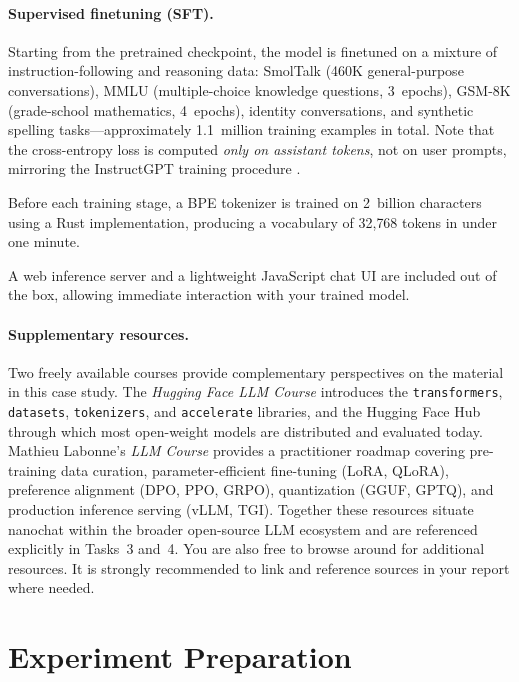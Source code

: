 \paragraph{Supervised finetuning (SFT).}  Starting from the pretrained checkpoint, the model is finetuned on a mixture of instruction-following and reasoning data: SmolTalk \citep{benallal2024smoltalk} (460K general-purpose conversations), MMLU (multiple-choice knowledge questions, 3~epochs), GSM-8K (grade-school mathematics, 4~epochs), identity conversations, and synthetic spelling tasks---approximately 1.1~million training examples in total. Note that  the cross-entropy loss is computed \emph{only on assistant tokens}, not on user prompts, mirroring the InstructGPT training procedure \citep{ouyang2022training}.

Before each training stage, a BPE tokenizer is trained on 2~billion characters using a Rust implementation, producing a vocabulary of 32{,}768 tokens in under one minute.

A web inference server and a lightweight JavaScript chat UI are included out of the box, allowing immediate interaction with your trained model.

\paragraph{Supplementary resources.}  Two freely available courses provide complementary perspectives on the material in this case study.  The \textit{Hugging Face LLM Course} \citep{huggingface2022course} introduces the \texttt{transformers}, \texttt{datasets}, \texttt{tokenizers}, and \texttt{accelerate} libraries, and the Hugging Face Hub through which most open-weight models are distributed and evaluated today. Mathieu Labonne's \textit{LLM Course} \citep{labonne2023llmcourse} provides a practitioner roadmap covering pre-training data curation, parameter-efficient fine-tuning (LoRA, QLoRA), preference alignment (DPO, PPO, GRPO), quantization (GGUF, GPTQ), and production inference serving (vLLM, TGI).  Together these resources situate nanochat within the broader open-source LLM ecosystem and are referenced explicitly in Tasks~3 and~4. You are also free to browse around for additional resources. It is strongly recommended to link and reference sources in your report where needed.

\section{Experiment Preparation}
\label{sec:preparation}

